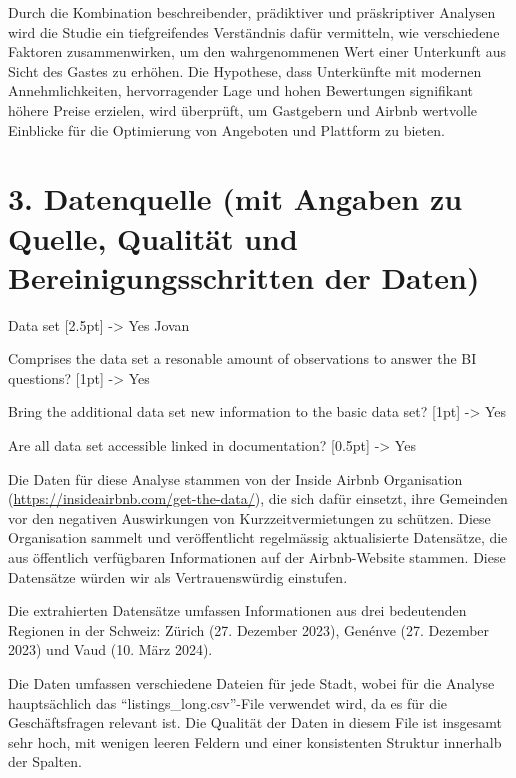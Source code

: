 \documentclass[
  journal,
]{IEEEtran}%
\begin{document}
Durch die Kombination beschreibender, prädiktiver und präskriptiver
Analysen wird die Studie ein tiefgreifendes Verständnis dafür
vermitteln, wie verschiedene Faktoren zusammenwirken, um den
wahrgenommenen Wert einer Unterkunft aus Sicht des Gastes zu erhöhen.
Die Hypothese, dass Unterkünfte mit modernen Annehmlichkeiten,
hervorragender Lage und hohen Bewertungen signifikant höhere Preise
erzielen, wird überprüft, um Gastgebern und Airbnb wertvolle Einblicke
für die Optimierung von Angeboten und Plattform zu bieten.

\hypertarget{datenquelle-mit-angaben-zu-quelle-qualituxe4t-und-bereinigungsschritten-der-daten}{%
\section{3. Datenquelle (mit Angaben zu Quelle, Qualität und
Bereinigungsschritten der
Daten)}\label{datenquelle-mit-angaben-zu-quelle-qualituxe4t-und-bereinigungsschritten-der-daten}}

Data set {[}2.5pt{]} -\textgreater{} Yes Jovan

Comprises the data set a resonable amount of observations to answer the
BI questions? {[}1pt{]} -\textgreater{} Yes

Bring the additional data set new information to the basic data set?
{[}1pt{]} -\textgreater{} Yes

Are all data set accessible linked in documentation? {[}0.5pt{]}
-\textgreater{} Yes

Die Daten für diese Analyse stammen von der Inside Airbnb Organisation
(\url{https://insideairbnb.com/get-the-data/}), die sich dafür einsetzt,
ihre Gemeinden vor den negativen Auswirkungen von Kurzzeitvermietungen
zu schützen. Diese Organisation sammelt und veröffentlicht regelmässig
aktualisierte Datensätze, die aus öffentlich verfügbaren Informationen
auf der Airbnb-Website stammen. Diese Datensätze würden wir als
Vertrauenswürdig einstufen.

Die extrahierten Datensätze umfassen Informationen aus drei bedeutenden
Regionen in der Schweiz: Zürich (27. Dezember 2023), Genénve (27.
Dezember 2023) und Vaud (10. März 2024).

Die Daten umfassen verschiedene Dateien für jede Stadt, wobei für die
Analyse hauptsächlich das ``listings\_long.csv''-File verwendet wird, da
es für die Geschäftsfragen relevant ist. Die Qualität der Daten in
diesem File ist insgesamt sehr hoch, mit wenigen leeren Feldern und
einer konsistenten Struktur innerhalb der Spalten.
\end{document}
